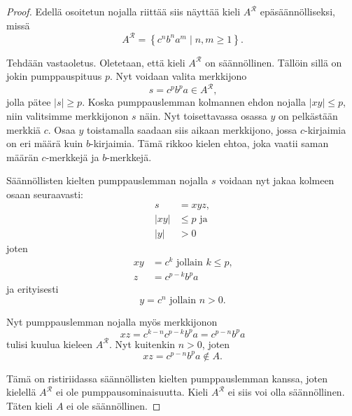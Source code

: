 \documentclass[a4paper,11pt]{article}
\theoremstyle{definition}
\newcommand{\set}[1]{{\left\{ #1 \right\}}}
\begin{document}
\begin{proof}

    Edellä osoitetun nojalla riittää siis näyttää kieli $A^\mathcal{R}$
    epäsäännölliseksi, missä
    \begin{equation*}
        A^\mathcal{R} = \set{c^nb^na^m \mid n,m \geq 1}.
    \end{equation*}

    Tehdään vastaoletus. Oletetaan, että kieli $A^\mathcal{R}$ on sään\-nöl\-li\-nen.
    Tällöin sillä on jokin pumppauspituus $p$. Nyt voidaan valita merkkijono
    \begin{equation*}
        s = c^pb^pa \in A^\mathcal{R} \textrm{,}
    \end{equation*}
    jolla pätee $|s| \geq p$. Koska pumppauslemman kolmannen ehdon nojalla
    $|xy| \leq p$, niin valitsimme merkkijonon $s$ näin. Nyt toisettavassa
    osassa $y$ on pelkästään merkkiä $c$. Osaa $y$ toistamalla saadaan siis
    aikaan merkkijono, jossa $c$-kirjaimia on eri määrä kuin $b$-kirjaimia.
    Tämä rikkoo kielen ehtoa, joka vaatii saman määrän $c$-merkkejä ja
    $b$-merkkejä.

    Säännöllisten kielten pumppauslemman nojalla $s$ voidaan nyt jakaa kolmeen
    osaan seuraavasti:
    \begin{align*}
        s    & = xyz, \\
        |xy| & \leq p \textrm{ ja}\\
        |y|  & > 0
    \end{align*}
    joten
    \begin{align*}
        xy & = c^k          \textrm{ jollain } k \leq p \text{,} \\
        z  & = c^{p-k}b^pa
    \end{align*}
    ja erityisesti
    \begin{equation*}
        y = c^n \text{ jollain } n > 0 \text{.}
    \end{equation*}

    Nyt pumppauslemman nojalla myös merkkijonon
    \begin{equation*}
        xz = c^{k-n}c^{p-k}b^pa = c^{p-n}b^pa
    \end{equation*}
    tulisi kuulua kieleen $A^\mathcal{R}$. Nyt kuitenkin $n > 0$, joten
    \begin{equation*}
        xz = c^{p-n}b^pa \notin A.
    \end{equation*}

    Tämä on ristiriidassa säännöllisten kielten pumppauslemman kanssa, joten
    kielellä $A^\mathcal{R}$ ei ole pumppausominaisuutta. Kieli $A^\mathcal{R}$
    ei siis voi olla säännöllinen. Täten kieli $A$ ei ole säännöllinen.
\end{proof}
\end{document}
